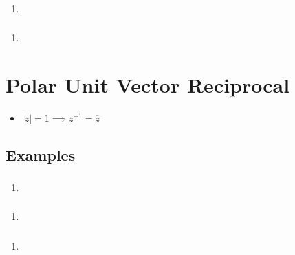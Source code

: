\documentclass{report}
\newcommand{\conjugate}[1]{\overline{#1}}
\newcommand{\abs}[1]{\mathopen|#1\mathclose|}
\begin{document}
                \subsubsection{}
                    \begin{enumerate}
                        \item 
                    \end{enumerate}
                \subsubsection{}
                    \begin{enumerate}
                        \item 
                    \end{enumerate}
        \section{Polar Unit Vector Reciprocal}
            \begin{itemize}
                \item $\abs{z}=1\implies z^{-1}=\conjugate{z}$
            \end{itemize}
            \subsection{Examples}
                \subsubsection{}
                    \begin{enumerate}
                        \item 
                    \end{enumerate}
                \subsubsection{}
                    \begin{enumerate}
                        \item 
                    \end{enumerate}
                \subsubsection{}
                    \begin{enumerate}
                        \item 
                    \end{enumerate}
\end{document}

